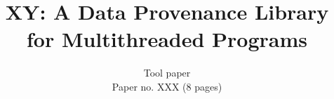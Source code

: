 \documentclass{IEEEtran}
\newcommand{\projecttitle}{\textsc{XY}\xspace}
\newcommand{\intelpt}{{Intel\textsuperscript{\textregistered} PT}\xspace}
\begin{document}
\author{
Tool paper\\
Paper no. XXX (8 pages)%
}

\title{\huge \projecttitle: A Data Provenance Library for Multithreaded Programs}%
\maketitle















\footnotesize


 
\end{document}
